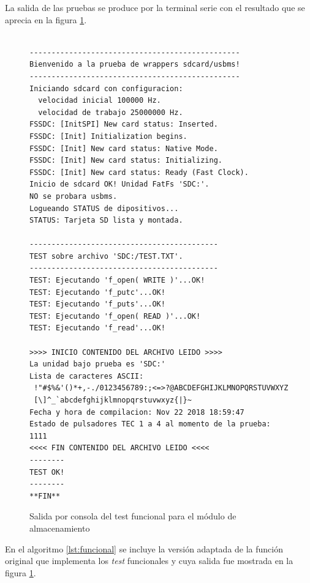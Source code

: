 La salida de las pruebas se produce por la terminal serie con el resultado que se aprecia en la figura \ref{fig:test_funcional}.

\begin{figure}[htpb]
\begin{center}
\begin{verbatim}

------------------------------------------------
Bienvenido a la prueba de wrappers sdcard/usbms!
------------------------------------------------
Iniciando sdcard con configuracion:
  velocidad inicial 100000 Hz.
  velocidad de trabajo 25000000 Hz.
FSSDC: [InitSPI] New card status: Inserted.
FSSDC: [Init] Initialization begins.
FSSDC: [Init] New card status: Native Mode.
FSSDC: [Init] New card status: Initializing.
FSSDC: [Init] New card status: Ready (Fast Clock).
Inicio de sdcard OK! Unidad FatFs 'SDC:'.
NO se probara usbms.
Logueando STATUS de dipositivos...
STATUS: Tarjeta SD lista y montada.

-------------------------------------------
TEST sobre archivo 'SDC:/TEST.TXT'.
-------------------------------------------
TEST: Ejecutando 'f_open( WRITE )'...OK!
TEST: Ejecutando 'f_putc'...OK!
TEST: Ejecutando 'f_puts'...OK!
TEST: Ejecutando 'f_open( READ )'...OK!
TEST: Ejecutando 'f_read'...OK!

>>>> INICIO CONTENIDO DEL ARCHIVO LEIDO >>>>
La unidad bajo prueba es 'SDC:'
Lista de caracteres ASCII:
 !"#$%&'()*+,-./0123456789:;<=>?@ABCDEFGHIJKLMNOPQRSTUVWXYZ
 [\]^_`abcdefghijklmnopqrstuvwxyz{|}~
Fecha y hora de compilacion: Nov 22 2018 18:59:47
Estado de pulsadores TEC 1 a 4 al momento de la prueba: 1111
<<<< FIN CONTENIDO DEL ARCHIVO LEIDO <<<<
--------
TEST OK!
--------
**FIN**
\end{verbatim}
\end{center}
\caption{Salida por consola del test funcional para el módulo de almacenamiento}
\label{fig:test_funcional}
\end{figure}


%


En el algoritmo \ref{lst:funcional} se incluye la versión adaptada de la función original que implementa los \textit{test} funcionales y cuya salida fue mostrada en la figura \ref{fig:test_funcional}. %

